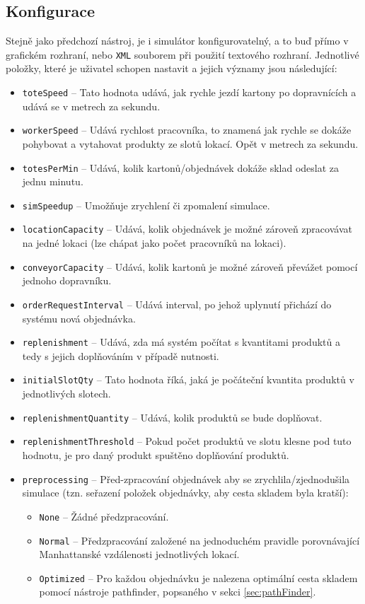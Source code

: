\subsection{Konfigurace}
Stejně jako předchozí nástroj, je i simulátor konfigurovatelný, a to buď přímo v grafickém rozhraní, nebo \texttt{XML} souborem při použití textového rozhraní. Jednotlivé položky, které je uživatel schopen nastavit a jejich významy jsou následující:

\begin{itemize}
    \item \texttt{toteSpeed} -- Tato hodnota udává, jak rychle jezdí kartony po dopravnících a udává se v metrech za sekundu.
    \item \texttt{workerSpeed} -- Udává rychlost pracovníka, to znamená jak rychle se dokáže pohybovat a vytahovat produkty ze slotů lokací. Opět v metrech za sekundu.
    \item \texttt{totesPerMin} -- Udává, kolik kartonů/objednávek dokáže sklad odeslat za jednu minutu.
    \item \texttt{simSpeedup} -- Umožňuje zrychlení či zpomalení simulace.
    \item \texttt{locationCapacity} -- Udává, kolik objednávek je možné zároveň zpracovávat na jedné lokaci (lze chápat jako počet pracovníků na lokaci).
    \item \texttt{conveyorCapacity} -- Udává, kolik kartonů je možné zároveň převážet pomocí jednoho dopravníku.
    \item \texttt{orderRequestInterval} -- Udává interval, po jehož uplynutí přichází do systému nová objednávka.
    \item \texttt{replenishment} -- Udává, zda má systém počítat s kvantitami produktů a tedy s jejich doplňováním v případě nutnosti.
    \item \texttt{initialSlotQty} -- Tato hodnota říká, jaká je počáteční kvantita produktů v jednotlivých slotech.
    \item \texttt{replenishmentQuantity} -- Udává, kolik produktů se bude doplňovat.
    \item \texttt{replenishmentThreshold} -- Pokud počet produktů ve slotu klesne pod tuto hodnotu, je pro daný produkt spuštěno doplňování produktů.
    \item \texttt{preprocessing} -- Před-zpracování objednávek aby se zrychlila/zjednodušila simulace (tzn. seřazení položek objednávky, aby cesta skladem byla kratší):
    \begin{itemize}
        \item \texttt{None} -- Žádné předzpracování.
        \item \texttt{Normal} -- Předzpracování založené na jednoduchém pravidle porovnávající Manhattanské vzdálenosti jednotlivých lokací. 
        \item \texttt{Optimized} -- Pro každou objednávku je nalezena optimální cesta skladem pomocí nástroje pathfinder, popsaného v sekci \ref{sec:pathFinder}.
    \end{itemize}
\end{itemize}

